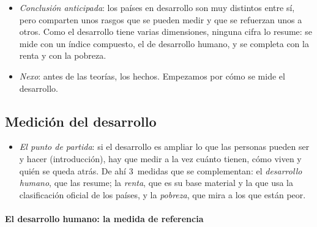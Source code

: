 \documentclass[11pt]{article}
\begin{document}
\begin{itemize}
\item \emph{Conclusión anticipada}: los países en desarrollo son muy distintos entre sí, pero comparten unos rasgos que se pueden medir y que se refuerzan unos a otros. Como el desarrollo tiene varias dimensiones, ninguna cifra lo resume: se mide con un índice compuesto, el de desarrollo humano, y se completa con la renta y con la pobreza.
\item \emph{Nexo}: antes de las teorías, los hechos. Empezamos por cómo se mide el desarrollo.
\end{itemize}

\subsection{Medición del desarrollo}\label{sec:medicion}

\begin{itemize}
\item \emph{El punto de partida}: si el desarrollo es ampliar lo que las personas pueden ser y hacer (introducción), hay que medir a la vez cuánto tienen, cómo viven y quién se queda atrás. De ahí 3~medidas que se complementan: el \emph{desarrollo humano}, que las resume; la \emph{renta}, que es su base material y la que usa la clasificación oficial de los países, y la \emph{pobreza}, que mira a los que están peor.
\end{itemize}

\paragraph{El desarrollo humano: la medida de referencia}
\end{document}
